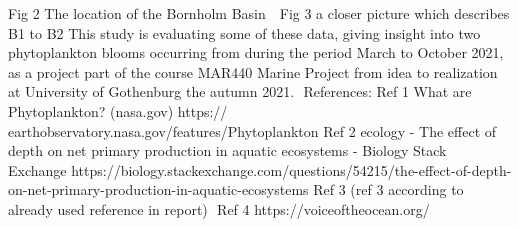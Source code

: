 \documentclass[../Main.tex]{subfiles}
\begin{document}
Fig 2 The location of the Bornholm Basin   Fig 3 a closer picture which describes B1 to B2 
This study is evaluating some of these data, giving insight into two phytoplankton blooms occurring from during the period March to October 2021, as a project part of the course MAR440 Marine Project from idea to realization at University of Gothenburg the autumn 2021. 
References:
Ref 1 What are Phytoplankton? (nasa.gov) https:// earthobservatory.nasa.gov/features/Phytoplankton
Ref 2 ecology - The effect of depth on net primary production in aquatic ecosystems - Biology Stack Exchange https://biology.stackexchange.com/questions/54215/the-effect-of-depth-on-net-primary-production-in-aquatic-ecosystems
Ref 3 (ref 3 according to already used reference in report)  Ref 4 https://voiceoftheocean.org/
\end{document}
